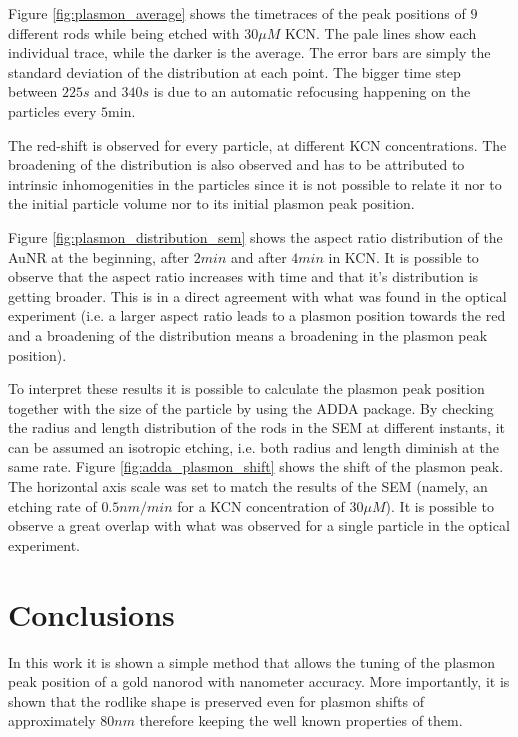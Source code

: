 \documentclass[twocolumn]{article}
\begin{document}
Figure \ref{fig:plasmon_average} shows the timetraces of the peak positions of
$9$ different rods while being etched with $30\mu M$ KCN. The pale lines show
each individual trace, while the darker is the average. The error bars are simply the
standard deviation of the distribution at each point. The bigger time step
between $225s$ and $340s$ is due to an automatic refocusing happening on the
particles every $5\textrm{min}$. 

The red-shift is observed for every particle, at different KCN concentrations.
The broadening of the distribution is also observed and has to be attributed to
intrinsic inhomogenities in the particles since it is not possible to relate it 
nor to the initial particle volume nor to its initial plasmon peak position. 

Figure \ref{fig:plasmon_distribution_sem} shows the aspect ratio distribution of
the AuNR at the beginning, after $2min$ and after $4min$ in KCN. It is possible
to observe that the aspect ratio increases with time and that it's distribution
is getting broader. This is in a direct agreement with what was found in the
optical experiment (i.e. a larger aspect ratio leads to a plasmon position
towards the red and a broadening of the distribution means a broadening in the
plasmon peak position). 

To interpret these results it is possible to calculate the plasmon peak position
together with the size of the particle by using the ADDA package. By checking
the radius and length distribution of the rods in the SEM at different instants, 
it can be assumed an isotropic etching, i.e. both radius and length diminish at
the same rate. Figure \ref{fig:adda_plasmon_shift} shows the shift of the
plasmon peak. The horizontal axis scale was set to match the results of the SEM
(namely, an etching rate of $0.5nm/min$ for a KCN concentration of $30\mu M$).
It is possible to observe a great overlap with what was observed for a single
particle in the optical experiment. 

\section{Conclusions}
In this work it is shown a simple method that allows the tuning of the plasmon
peak position of a gold nanorod with nanometer accuracy. More importantly, it is
shown that the rodlike shape is preserved even for plasmon shifts of
approximately $80nm$ therefore keeping the well known properties of them. 
\end{document}
